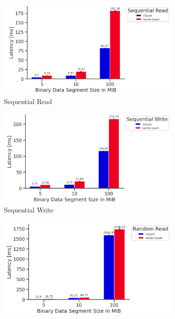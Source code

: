 \begin{figure}[ht] 
    \begin{subfigure}[b]{0.5\linewidth}
      \centering
      \includegraphics[width=0.9\linewidth]{images/Sequential_Read.PNG} 
      \caption{Sequential Read} 
      \label{fig7:a} 
      \vspace{4ex}
    \end{subfigure}%
    \begin{subfigure}[b]{0.5\linewidth}
      \centering
      \includegraphics[width=0.9\linewidth]{images/Sequential_Write.PNG} 
      \caption{Sequential Write} 
      \label{fig7:b} 
      \vspace{4ex}
    \end{subfigure} 
    \begin{subfigure}[b]{0.5\linewidth}
      \centering
      \includegraphics[width=0.9\linewidth]{images/Random_Read.PNG} 

\end{subfigure}
\end{figure}
